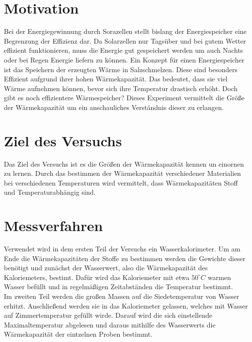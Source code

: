 \section{Motivation}

Bei der Energiegewinnung durch Sorazellen stellt bislang der Energiespeicher eine Begrenzung der Effizienz dar.
Da Solarzellen nur Tagsüber und bei gutem Wetter effizient funktionieren, muss die Energie gut gespeichert werden um auch Nachts oder bei Regen Energie liefern zu können.
Ein Konzept für einen Energiespeicher ist das Speichern der erzeugten Wärme in Salzschmelzen.
Diese sind besonders Effizient aufgrund ihrer hohen Wärmekapazität. Das bedeutet, dass sie viel Wärme aufnehmen können, bevor sich ihre Temperatur drastisch erhöht.
Doch gibt es noch effizientere Wärmespeicher? Dieses Experiment vermittelt die Größe der Wärmekapazität um ein anschauliches Verständnis dieser zu erlangen.

\section{Ziel des Versuchs}

Das Ziel des Versuchs ist es die Größen der Wärmekapazität kennen un einornen zu lernen.
Durch das bestimmen der Wärmekapazität verschiedener Materialien bei verschiedenen Temperaturen
wird vermittelt, dass Wärmekapazitäten Stoff und Temperaturabhängig sind.

\section{Messverfahren}

Verwendet wird in dem ersten Teil der Versuchs ein Wasserkalorimeter.
Um am Ende die Wärmekapazitäten der Stoffe zu bestimmen werden die Gewichte dieser benötigt und zunächst der Wasserwert, also die Wärmekapazität des Kaloriemeters, bestimt.
Dafür wird das Kaloriemeter mit etwa $50 ^\circ C$ warmen Wasser befüllt und in regelmäßigen Zeitabständen die Temperatur bestimmt.\\

Im zweiten Teil werden die großen Massen auf die Siedetemperatur von Wasser erhitzt. Anschließend werden sie in das Kaloriemeter gelassen, welches mit Wasser auf Zimmertemperatur gefüllt wirde.
Darauf wird die sich einstellende Maximaltemperatur abgelesen und daraus mithilfe des Wasserwerts die Wärmekapazität der eintzelnen Proben bestimmt. \\

